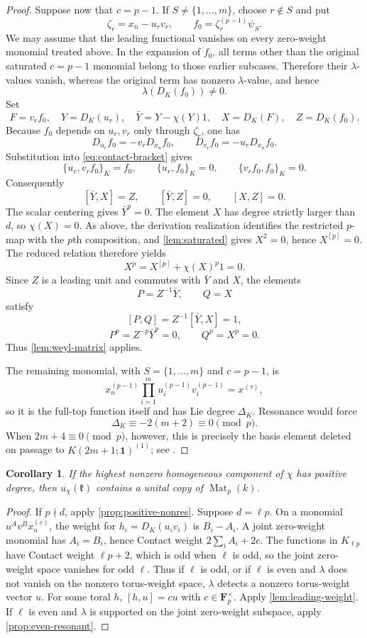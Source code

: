 \documentclass[11pt,reqno]{amsart}
\newtheorem{corollary}[corollary]{Corollary}
\theoremstyle{definition}
\theoremstyle{remark}
\theoremstyle{definition}
\newcommand{\kk}{\mathfrak{k}}
\newcommand{\Mat}{\operatorname{Mat}}
\newcommand{\Fp}{\mathbf F_p}
\begin{document}
\begin{proof}
Suppose now that $c=p-1$.  If $S\ne\{1,\ldots,m\}$, choose
$r\notin S$ and put
\[
 \zeta_r=x_n-u_rv_r,
 \qquad f_0=\zeta_r^{(p-1)}\psi_S.
\]
We may assume that the leading functional vanishes on every zero-weight
monomial treated above.  In the expansion of $f_0$, all terms other than the
original saturated
$c=p-1$ monomial belong to those earlier subcases.  Therefore their
$\lambda$-values vanish, whereas the original term has nonzero
$\lambda$-value, and hence
\[
 \lambda(D_K(f_0))\ne0.
\]
Set
\[
 F=v_rf_0,
 \quad Y=D_K(u_r),
 \quad \bar Y=Y-\chi(Y)1,
 \quad X=D_K(F),
 \quad Z=D_K(f_0).
\]
Because $f_0$ depends on $u_r,v_r$ only through $\zeta_r$, one has
\[
 D_{u_r}f_0=-v_rD_{x_n}f_0,
 \qquad
 D_{v_r}f_0=-u_rD_{x_n}f_0.
\]
Substitution into \eqref{eq:contact-bracket} gives
\[
 \{u_r,v_rf_0\}_K=f_0,
 \qquad
 \{u_r,f_0\}_K=0,
 \qquad
 \{v_rf_0,f_0\}_K=0.
\]
Consequently
\[
 [\bar Y,X]=Z,
 \qquad [\bar Y,Z]=0,
 \qquad [X,Z]=0.
\]
The scalar centering gives $\bar Y^p=0$.  The element $X$ has degree strictly larger than $d$, so $\chi(X)=0$.  As
above, the derivation realization identifies the restricted $p$-map with the
$p$th composition, and \cref{lem:saturated} gives $X^2=0$, hence
$X^{[p]}=0$.  The reduced relation therefore yields
\[
 X^p=X^{[p]}+\chi(X)^p1=0.
\]
Since $Z$ is a leading unit and commutes with $\bar Y$ and $X$, the elements
\[
 P=Z^{-1}\bar Y,
 \qquad Q=X
\]
satisfy
\[
 [P,Q]=Z^{-1}[\bar Y,X]=1,
\]
\[
 P^p=Z^{-p}\bar Y^p=0,
 \qquad Q^p=X^p=0.
\]
Thus \cref{lem:weyl-matrix} applies.

The remaining monomial, with $S=\{1,\ldots,m\}$ and $c=p-1$, is
\[
 x_n^{(p-1)}\prod_{i=1}^m u_i^{(p-1)}v_i^{(p-1)}=x^{(\tau)},
\]
so it is the full-top function itself and has Lie degree $\Delta_K$.
Resonance would force
\[
 \Delta_K\equiv-2(m+2)\equiv0\pmod p.
\]
When $2m+4\equiv0\pmod p$, however, this is precisely the basis element
deleted on passage to $K(2m+1;\mathbf1)^{(1)}$; see
\cite[Section~2]{Mygind2014}.
\end{proof}

\begin{corollary}\label{cor:positive-leading}
If the highest nonzero homogeneous component of $\chi$ has positive degree,
then $u_\chi(\kk)$ contains a unital copy of $\Mat_p(k)$.
\end{corollary}

\begin{proof}
If $p\nmid d$, apply \cref{prop:positive-nonres}.
Suppose $d=\ell p$.  On a monomial $u^Av^Bx_n^{(c)}$, the weight for
$h_i=D_K(u_iv_i)$ is $B_i-A_i$.  A joint zero-weight monomial has
$A_i=B_i$, hence Contact weight $2\sum_iA_i+2c$.  The functions in
$K_{\ell p}$ have Contact weight $\ell p+2$, which is odd when $\ell$ is odd, so
the joint zero-weight space vanishes for odd $\ell$.  Thus if $\ell$ is odd,
or if $\ell$ is even and $\lambda$ does not vanish on the nonzero
torus-weight space, $\lambda$ detects a nonzero torus-weight vector $u$.
For some toral $h$, $[h,u]=cu$ with $c\in\Fp^\times$.  Apply
\cref{lem:leading-weight}.
If $\ell$ is even and $\lambda$ is supported on the joint zero-weight
subspace, apply \cref{prop:even-resonant}.
\end{proof}
\end{document}
